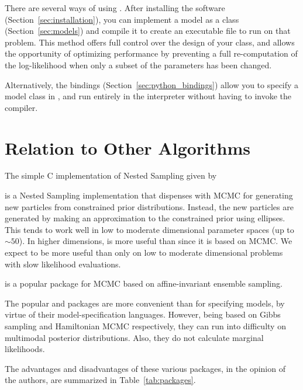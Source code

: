 \documentclass[article, nojss]{jss}
\begin{document}
There are several ways of using . After installing the software
(Section~\ref{sec:installation}), you can implement a model as
a  class
(Section~\ref{sec:models}) and compile it to create an executable file
to run  on that problem. This method offers full control over the
design of your class, and allows the opportunity of optimizing
performance by preventing a full re-computation of the log-likelihood when
only a subset of the parameters has been changed.

Alternatively, the 
bindings (Section~\ref{sec:python_bindings}) allow you
to specify a model class in , and run  entirely
in the  interpreter without having to invoke the 
compiler.

\section{Relation to Other Algorithms}\label{sec:relation}
The simple C implementation of Nested Sampling given by
\citet{skilling2006nested}

 \citep{feroz2009multinest} is a Nested Sampling implementation
that dispenses with MCMC for generating new particles from constrained
prior distributions. Instead, the new particles are generated by making
an approximation to the constrained prior using ellipses. This tends to work
well in low to moderate dimensional parameter spaces (up to $\sim 50$).
In higher dimensions,  is more useful than 
since it is based on MCMC. We expect  to be more useful
than
 only on low to moderate dimensional problems with slow
likelihood evaluations.

 \citep{emcee} is a popular  package for MCMC
based on affine-invariant ensemble sampling.


The popular  \citep{jags} and  \citep{stan} packages
are more convenient than  for specifying models, by virtue
of their model-specification languages. However, being based on Gibbs
sampling and Hamiltonian MCMC respectively, they can run into difficulty
on multimodal posterior distributions. Also, they do not calculate
marginal likelihoods.

The advantages and disadvantages of these various packages, in the opinion
of the authors, are summarized in Table~\ref{tab:packages}.

%
\end{document}
